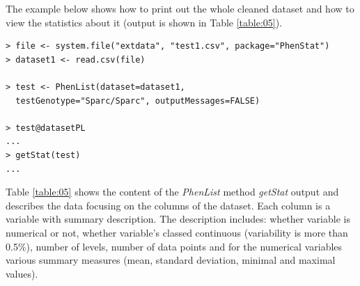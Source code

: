 \documentclass[12pt,a4paper]{article}
\begin{document}
The example below shows how to print out the whole cleaned dataset and how to view the statistics about it (output is shown in Table \ref{table:05}). 


\begingroup
    \fontsize{8pt}{12pt}\selectfont
\begin{verbatim}
> file <- system.file("extdata", "test1.csv", package="PhenStat") 
> dataset1 <- read.csv(file)

> test <- PhenList(dataset=dataset1,
  testGenotype="Sparc/Sparc", outputMessages=FALSE)

> test@datasetPL
...
> getStat(test)
...
\end{verbatim}
\endgroup
Table \ref{table:05} shows the content of the \textit{PhenList} method \textit{getStat} output and describes the data focusing on the columns of the dataset. Each column is a variable with summary description. 
The description includes: whether variable is numerical or not, whether variable's classed continuous (variability is more than 0.5\%), number of levels, number of data points and for the numerical variables various summary measures (mean, standard deviation, minimal and maximal values).
\end{document}
